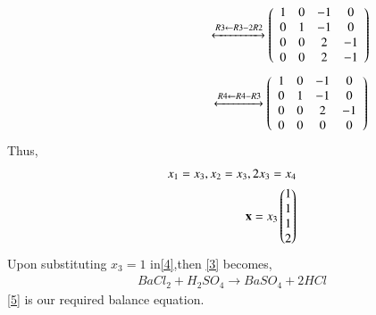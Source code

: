 \documentclass[journal,12pt,twocolumn]{IEEEtran}
\begin{document}
\begin{align}
   \hspace{3.3cm}\xleftrightarrow[]{R3\leftarrow R3-2R2} \left(\begin{array}{cccc}
1 & 0 & -1 & 0\\
0 & 1 & -1 & 0\\
0 & 0 & 2 & -1\\
0 & 0 & 2 & -1
\end{array}\right)
\end{align}
\begin{align}
   \hspace{3.3cm}\xleftrightarrow[]{R4\leftarrow R4-R3} \left(\begin{array}{cccc}
1 & 0 & -1 & 0\\
0 & 1 & -1 & 0\\
0 & 0 & 2 & -1\\
0 & 0 & 0 & 0
\end{array}\right)
\end{align}
Thus,
\begin{align}
    x_1=x_3,x_2=x_3,2x_3=x_4\\
    \mathbf{x}=x_3\begin{pmatrix}1\\1\\1\\2\end{pmatrix}\label{4}
\end{align}
Upon substituting $x_3=1$ in\eqref{4},then \eqref{3} becomes,
\begin{align}\label{5}
    \boxed{BaCl_2 + H_2SO_4 \xrightarrow{} BaSO_4 + 2HCl}
\end{align}
 \eqref{5} is our required balance equation.
\end{document}

